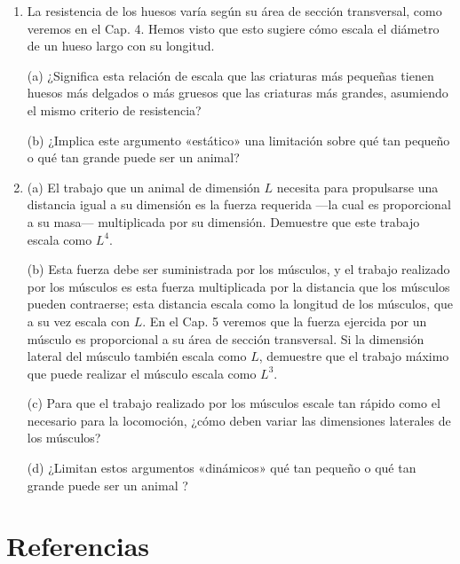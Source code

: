 \documentclass[12pt]{book}
\begin{document}
\begin{enumerate}
\item[1.60] La resistencia de los huesos varía según su área de sección transversal, como veremos en el Cap. 4. Hemos visto que esto sugiere cómo escala el diámetro de un hueso largo con su longitud.
  
  (a) ¿Significa esta relación de escala que las criaturas más pequeñas tienen huesos más delgados o más gruesos que las criaturas más grandes, asumiendo el mismo criterio de resistencia?
  
  (b) ¿Implica este argumento «estático» una limitación sobre qué tan pequeño o qué tan grande puede ser un animal?

\item[1.61] (a) El trabajo que un animal de dimensión $L$ necesita para propulsarse una distancia igual a su dimensión es la fuerza requerida ---la cual es proporcional a su masa--- multiplicada por su dimensión. Demuestre que este trabajo escala como $L^4$.
  
  (b) Esta fuerza debe ser suministrada por los músculos, y el trabajo realizado por los músculos es esta fuerza multiplicada por la distancia que los músculos pueden contraerse; esta distancia escala como la longitud de los músculos, que a su vez escala con $L$. En el Cap. 5 veremos que la fuerza ejercida por un músculo es proporcional a su área de sección transversal. Si la dimensión lateral del músculo también escala como $L$, demuestre que el trabajo máximo que puede realizar el músculo escala como $L^3$.
  
  (c) Para que el trabajo realizado por los músculos escale tan rápido como el necesario para la locomoción, ¿cómo deben variar las dimensiones laterales de los músculos?
  
  (d) ¿Limitan estos argumentos «dinámicos» qué tan pequeño o qué tan grande puede ser un animal \cite{24}?

\end{enumerate}

\section*{Referencias}
\end{document}
